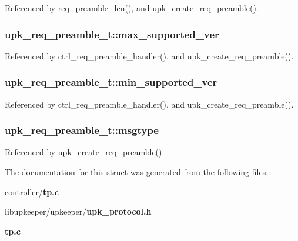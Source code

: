 Referenced by req\_\-preamble\_\-len(), and upk\_\-create\_\-req\_\-preamble().

\subsubsection[{max\_\-supported\_\-ver}]{ {\bf upk\_\-req\_\-preamble\_\-t::max\_\-supported\_\-ver}}\label{structupk__req__preamble__t_a229ac56dffaffc07213d4f63d1fc4540}


Referenced by ctrl\_\-req\_\-preamble\_\-handler(), and upk\_\-create\_\-req\_\-preamble().

\subsubsection[{min\_\-supported\_\-ver}]{ {\bf upk\_\-req\_\-preamble\_\-t::min\_\-supported\_\-ver}}\label{structupk__req__preamble__t_a47fb19db9df40e58c4ee3f7027edfdf6}


Referenced by ctrl\_\-req\_\-preamble\_\-handler(), and upk\_\-create\_\-req\_\-preamble().

\subsubsection[{msgtype}]{ {\bf upk\_\-req\_\-preamble\_\-t::msgtype}}\label{structupk__req__preamble__t_a25327dc25130f88e919e2a728b3d26c5}


Referenced by upk\_\-create\_\-req\_\-preamble().



The documentation for this struct was generated from the following files:\begin{DoxyCompactItemize}
\item 
controller/{\bf tp.c}\item 
libupkeeper/upkeeper/{\bf upk\_\-protocol.h}\item 
{\bf tp.c}\end{DoxyCompactItemize}

